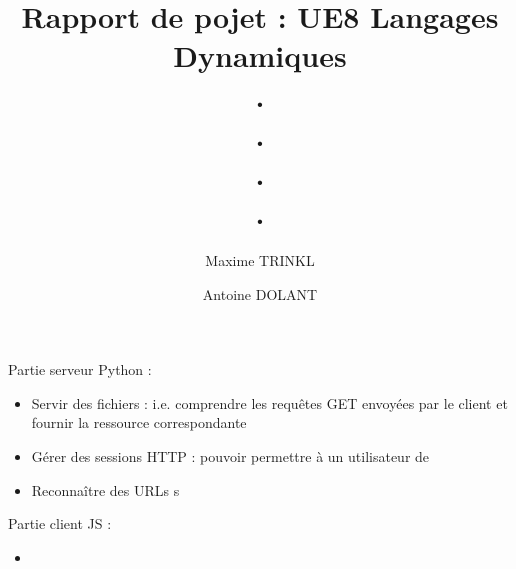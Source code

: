 \documentclass[10pt]{report}
\title{\Huge Rapport de pojet : UE8 Langages Dynamiques\\ . \\ . \\ . \\ . }
\author{Maxime TRINKL \and Antoine DOLANT}
\begin{document}
\maketitle
\newpage
Partie serveur Python : 
\begin{itemize}
\item Servir des fichiers : i.e. comprendre les requêtes GET envoyées par le client et fournir la ressource correspondante
\item Gérer des sessions HTTP : pouvoir permettre à un utilisateur de 
\item Reconnaître des URLs s

\end{itemize}




Partie client JS :
\begin{itemize}
\item 


\end{itemize}
\end{document}
